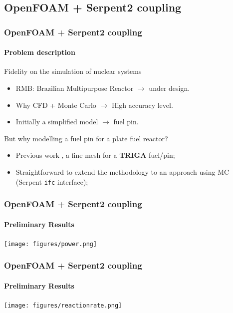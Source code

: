 \documentclass[svgnames,smaller,table,draft]{beamer}
\begin{document}
\subsection{OpenFOAM + Serpent2 coupling}
\begin{frame}
  \frametitle{OpenFOAM + Serpent2 coupling}
  \framesubtitle{Problem description}
  \begin{center}
    \alert{Fidelity on the simulation of nuclear systems}\\
    \vspace{10px}
    \begin{itemize}
    \item RMB: Brazilian Multipurpose Reactor $\rightarrow$ under design.
    \item Why CFD + Monte Carlo $\rightarrow$ High accuracy level.
    \item Initially a simplified model $\rightarrow$ fuel pin.
    \end{itemize}
    \vspace{10px}
    \alert{But why modelling a fuel pin for a plate fuel reactor?}
    \vspace{10px}
    \begin{itemize}
    \item Previous work \cite{Vasconcelos2018}, a fine mesh for a \textbf{TRIGA} fuel/pin;
    \item Straightforward to extend the methodology to an approach using MC (Serpent \texttt{ifc} interface);
    \end{itemize}
  \end{center}
\end{frame}

\begin{frame}
  \frametitle{OpenFOAM + Serpent2 coupling}
  \framesubtitle{Preliminary Results}
  \begin{center}
    \texttt{[image: figures/power.png]}
    
  \end{center}
\end{frame}

\begin{frame}
  \frametitle{OpenFOAM + Serpent2 coupling}
  \framesubtitle{Preliminary Results}
  \begin{center}
    \texttt{[image: figures/reactionrate.png]}
    
  \end{center}
\end{frame}
\end{document}
